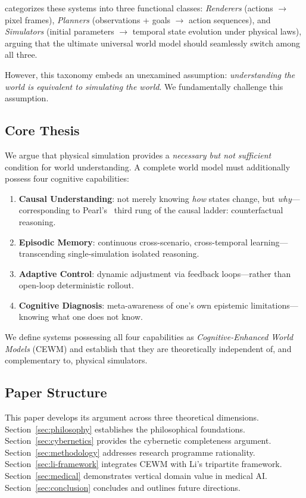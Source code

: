 \documentclass[11pt,a4paper]{article}
\newcommand{\CEWM}{\textsc{CEWM}}
\begin{document}
\citet{li2024worldmodels} categorizes these systems into three functional classes: \emph{Renderers} (actions $\to$ pixel frames), \emph{Planners} (observations + goals $\to$ action sequences), and \emph{Simulators} (initial parameters $\to$ temporal state evolution under physical laws), arguing that the ultimate universal world model should seamlessly switch among all three.

However, this taxonomy embeds an unexamined assumption: \emph{understanding the world is equivalent to simulating the world}. We fundamentally challenge this assumption.

\subsection{Core Thesis}

We argue that physical simulation provides a \emph{necessary but not sufficient} condition for world understanding. A complete world model must additionally possess four cognitive capabilities:
\begin{enumerate}[nosep]
  \item \textbf{Causal Understanding}: not merely knowing \emph{how} states change, but \emph{why}---corresponding to Pearl's~\citeyearpar{pearl2009causality} third rung of the causal ladder: counterfactual reasoning.
  \item \textbf{Episodic Memory}: continuous cross-scenario, cross-temporal learning---transcending single-simulation isolated reasoning.
  \item \textbf{Adaptive Control}: dynamic adjustment via feedback loops---rather than open-loop deterministic rollout.
  \item \textbf{Cognitive Diagnosis}: meta-awareness of one's own epistemic limitations---knowing what one does not know.
\end{enumerate}

We define systems possessing all four capabilities as \emph{Cognitive-Enhanced World Models} (\CEWM{}) and establish that they are theoretically independent of, and complementary to, physical simulators.

\subsection{Paper Structure}

This paper develops its argument across three theoretical dimensions. Section~\ref{sec:philosophy} establishes the philosophical foundations. Section~\ref{sec:cybernetics} provides the cybernetic completeness argument. Section~\ref{sec:methodology} addresses research programme rationality. Section~\ref{sec:li-framework} integrates \CEWM{} with Li's tripartite framework. Section~\ref{sec:medical} demonstrates vertical domain value in medical AI. Section~\ref{sec:conclusion} concludes and outlines future directions.
\end{document}
